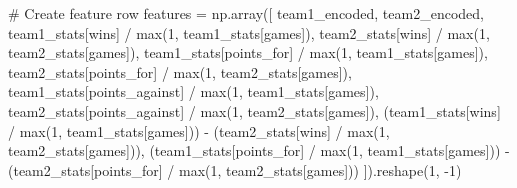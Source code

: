 \documentclass[
  letterpaper,
  DIV=11,
  numbers=noendperiod]{scrartcl}
\newenvironment{Shaded}{\begin{snugshade}}{\end{snugshade}}
\newcommand{\BuiltInTok}[1]{\textcolor[rgb]{0.00,0.23,0.31}{#1}}
\newcommand{\CommentTok}[1]{\textcolor[rgb]{0.37,0.37,0.37}{#1}}
\newcommand{\DecValTok}[1]{\textcolor[rgb]{0.68,0.00,0.00}{#1}}
\newcommand{\NormalTok}[1]{\textcolor[rgb]{0.00,0.23,0.31}{#1}}
\newcommand{\OperatorTok}[1]{\textcolor[rgb]{0.37,0.37,0.37}{#1}}
\newcommand{\StringTok}[1]{\textcolor[rgb]{0.13,0.47,0.30}{#1}}
\begin{document}
\begin{Shaded}
\begin{Highlighting}[]
        \CommentTok{\# Create feature row}
\NormalTok{        features }\OperatorTok{=}\NormalTok{ np.array([}
\NormalTok{            team1\_encoded, team2\_encoded,}
\NormalTok{            team1\_stats[}\StringTok{\textquotesingle{}wins\textquotesingle{}}\NormalTok{] }\OperatorTok{/} \BuiltInTok{max}\NormalTok{(}\DecValTok{1}\NormalTok{, team1\_stats[}\StringTok{\textquotesingle{}games\textquotesingle{}}\NormalTok{]),}
\NormalTok{            team2\_stats[}\StringTok{\textquotesingle{}wins\textquotesingle{}}\NormalTok{] }\OperatorTok{/} \BuiltInTok{max}\NormalTok{(}\DecValTok{1}\NormalTok{, team2\_stats[}\StringTok{\textquotesingle{}games\textquotesingle{}}\NormalTok{]),}
\NormalTok{            team1\_stats[}\StringTok{\textquotesingle{}points\_for\textquotesingle{}}\NormalTok{] }\OperatorTok{/} \BuiltInTok{max}\NormalTok{(}\DecValTok{1}\NormalTok{, team1\_stats[}\StringTok{\textquotesingle{}games\textquotesingle{}}\NormalTok{]),}
\NormalTok{            team2\_stats[}\StringTok{\textquotesingle{}points\_for\textquotesingle{}}\NormalTok{] }\OperatorTok{/} \BuiltInTok{max}\NormalTok{(}\DecValTok{1}\NormalTok{, team2\_stats[}\StringTok{\textquotesingle{}games\textquotesingle{}}\NormalTok{]),}
\NormalTok{            team1\_stats[}\StringTok{\textquotesingle{}points\_against\textquotesingle{}}\NormalTok{] }\OperatorTok{/} \BuiltInTok{max}\NormalTok{(}\DecValTok{1}\NormalTok{, team1\_stats[}\StringTok{\textquotesingle{}games\textquotesingle{}}\NormalTok{]),}
\NormalTok{            team2\_stats[}\StringTok{\textquotesingle{}points\_against\textquotesingle{}}\NormalTok{] }\OperatorTok{/} \BuiltInTok{max}\NormalTok{(}\DecValTok{1}\NormalTok{, team2\_stats[}\StringTok{\textquotesingle{}games\textquotesingle{}}\NormalTok{]),}
\NormalTok{            (team1\_stats[}\StringTok{\textquotesingle{}wins\textquotesingle{}}\NormalTok{] }\OperatorTok{/} \BuiltInTok{max}\NormalTok{(}\DecValTok{1}\NormalTok{, team1\_stats[}\StringTok{\textquotesingle{}games\textquotesingle{}}\NormalTok{])) }\OperatorTok{{-}} 
\NormalTok{            (team2\_stats[}\StringTok{\textquotesingle{}wins\textquotesingle{}}\NormalTok{] }\OperatorTok{/} \BuiltInTok{max}\NormalTok{(}\DecValTok{1}\NormalTok{, team2\_stats[}\StringTok{\textquotesingle{}games\textquotesingle{}}\NormalTok{])),}
\NormalTok{            (team1\_stats[}\StringTok{\textquotesingle{}points\_for\textquotesingle{}}\NormalTok{] }\OperatorTok{/} \BuiltInTok{max}\NormalTok{(}\DecValTok{1}\NormalTok{, team1\_stats[}\StringTok{\textquotesingle{}games\textquotesingle{}}\NormalTok{])) }\OperatorTok{{-}} 
\NormalTok{            (team2\_stats[}\StringTok{\textquotesingle{}points\_for\textquotesingle{}}\NormalTok{] }\OperatorTok{/} \BuiltInTok{max}\NormalTok{(}\DecValTok{1}\NormalTok{, team2\_stats[}\StringTok{\textquotesingle{}games\textquotesingle{}}\NormalTok{]))}
\NormalTok{        ]).reshape(}\DecValTok{1}\NormalTok{, }\OperatorTok{{-}}\DecValTok{1}\NormalTok{)}
        

\end{Highlighting}
\end{Shaded}
\end{document}
